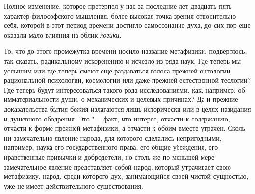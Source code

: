 Полное изменение, которое претерпел у нас за последние лет двадцать пять
характер философского мышления, более высокая точка зрения относительно себя,
которой в этот период времени достигло самосознание духа, до сих пор еще
оказали мало влияния на облик {\em логики}.

То, чт\'{о} до этого промежутка времени носило название метафизики,
подверглось, так сказать, радикальному искоренению и исчезло из ряда наук. Где
теперь мы услышим или где теперь смеют еще раздаваться голоса прежней
онтологии, рациональной психологии, космологии или даже прежней естественной
теологии? Где теперь будут интересоваться такого рода исследованиями, как,
например, об имматериальности души, о механических и целевых причинах? Да и
прежние доказательства бытия божия излагаются лишь исторически или в целях
назидания и душевного ободрения. Это "--- факт, что интерес, отчасти к
содержанию, отчасти к форме прежней метафизики, а отчасти к обоим вместе
утрачен. Сколь ни замечательно явление народа, для которого сделались
непригодными, например, наука его государственного права, его общие убеждения,
его нравственные привычки и добродетели, но столь же по меньшей мере
замечательное явление представляет собой народ, который утрачивает свою
метафизику, народ, среди которого дух, занимающийся своей чистой сущностью,
уже не имеет действительного существования.

